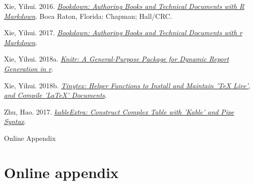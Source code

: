 \documentclass[
  12pt,
]{article}
\newlength{\cslhangindent}
\newlength{\cslentryspacingunit} %
\newenvironment{CSLReferences}[2] %
 {%
  \setlength{\parindent}{0pt}
  \ifodd #1
  \let\oldpar\par
  \def\par{\hangindent=\cslhangindent\oldpar}
  \fi
  \setlength{\parskip}{#2\cslentryspacingunit}
 }%
 {}
\begin{document}
\begin{CSLReferences}{1}{0}
\leavevmode{}%
Xie, Yihui. 2016. \emph{\href{https://github.com/rstudio/bookdown}{Bookdown: Authoring Books and Technical Documents with {R} Markdown}}. Boca Raton, Florida: Chapman; Hall/CRC.

\leavevmode{}%
Xie, Yihui. 2017. \emph{\href{https://github.com/rstudio/bookdown}{Bookdown: Authoring Books and Technical Documents with r Markdown}}.

\leavevmode{}%
Xie, Yihui. 2018a. \emph{\href{https://yihui.name/knitr/}{Knitr: A General-Purpose Package for Dynamic Report Generation in r}}.

\leavevmode{}%
Xie, Yihui. 2018b. \emph{\href{https://CRAN.R-project.org/package=tinytex}{Tinytex: Helper Functions to Install and Maintain 'TeX Live', and Compile 'LaTeX' Documents}}.

\leavevmode{}%
Zhu, Hao. 2017. \emph{\href{https://CRAN.R-project.org/package=kableExtra}{kableExtra: Construct Complex Table with 'Kable' and Pipe Syntax}}.

\end{CSLReferences}

\clearpage

\appendix
{}

\renewcommand{\thesection}{A}

\setcounter{page}{1}

\setcounter{table}{0}
\renewcommand{\thetable}{A\arabic{table}}
\renewcommand{\figurename}{Table}

\setcounter{figure}{0}
\renewcommand\thefigure{A\arabic{figure}}
\renewcommand{\figurename}{Figure}

\clearpage
{}

\vspace*{7cm}

\begin{center}
\begin{huge}
Online Appendix
\end{huge}
\end{center}
\vspace{3cm}

\clearpage
{}

\hypertarget{online-appendix}{%
\section{Online appendix}\label{online-appendix}}
\end{document}
